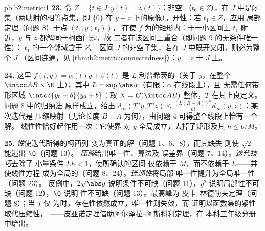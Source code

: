 \begin{solution}{pb:b2:metric:1}
\textbf{23.} 令 $Z = \{t \in J : y(t) = z(t)\}$：非空
（$t_0 \in Z$），在 $J$ 中是闭集（两映射的相等点集，即
$\{0\}$ 在 $y - z$ 下的原像）。开性：若 $t_1 \in Z$，应用
局部定理（问题 8）于点 $(t_1, y(t_1))$，
在使 $f$ 为的矩形内：于一小区间上
$t_1$ 附近，$y$ 与 $z$ 都解同一柯西问题，故
二者在该区间上重合（即问题 9 的无条件唯一性）：
$t_1$ 的一个邻域含于 $Z$。
区间 $J$ 的非空子集，若在 $J$ 中既开又闭，则必为整个 $J$
（区间连通，见
\cref{thm:b2:metric:connectedness}）：$y = z$ 于 $J$ 上。

\textbf{24.} 这里 $f(t, y) = \alpha(t)y + \beta(t)$ 是
$L$-利普希茨的（关于 $y$，在整个 $\intcc AB \times \R$ 上），其中 $L =
\sup\abs\alpha$（有限：$\alpha$ 在线段上），且
无需任何带形区域 $\intcc{y_0 - b}{y_0 + b}$：取 $X = C(\intcc
AB)$ 整体，$T$ 在其上良定义。问题 8 中的归纳法
原样成立，给出 $d_\infty(T^ny, T^nz) \leq
\frac{(L(B - A))^n}{n!}d_\infty(y, z)$：某次迭代是
压缩映射（无论长度 $B - A$ 为何），由问题 4
可得整个线段上恰有一个解。
线性性恰好起作用一次：它使界
对 $y$ 全局成立，去掉了矩形及其 $h \leq b/M$。

\textbf{25.} \emph{性}使迭代所得的柯西列
变为真正的解（问题 1、6、8），而其缺失
则使 $\sqrt2$ 能逃出 $\Q$（问题 13）。
\emph{压缩}给出唯一性、算法及
误差界（问题 7、14）。\emph{迭代技巧}去除了
小量条件 $Lh < 1$，使所确认的区间
仅依赖于 $M$，而不依赖于 $L$——并使线性方程
成为全局的（问题 8、24）。\emph{连通性}将局部
唯一性提升为全局唯一性（问题 23）。
反例中，$2\sqrt{\abs y}$ 说明条件不可缺（问题
11），$y^2$ 说明局部性不可缺（问题 12），$\Q$ 说明
性不可缺（问题 13）。最高峰为
皮卡--林德勒夫定理（问题 8）；当 $f$ 仅
为时，存在性依然成立，唯一性则失效，而
证明以函数集的紧性取代压缩性，
——皮亚诺定理借助阿尔泽拉--阿斯科利定理，在
本科三年级分册中给出。
\end{solution}
